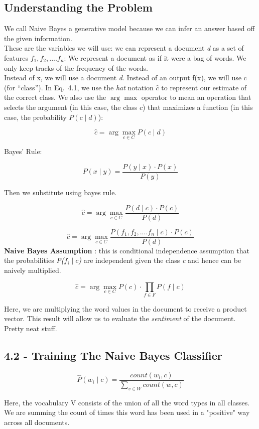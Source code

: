 \documentclass{article}
\begin{document}
\subsection{Understanding the Problem}
We call Naive Bayes a generative model because we can infer an answer based off the given information.
\\These are the variables we will use: we can represent a document \textit{d} as a set of features $f_1, f_2,.... f_n$:
We represent a document as if it were a bag of words. We only keep tracks of the frequency of the words.
\\Instead of x, we will use a document \textit{d}. Instead of an output f(x), we will use c (for “class”).
In Eq.~4.1, we use the \emph{hat} notation $\hat{c}$ to represent our estimate of the correct class.
We also use the $\arg\max$ operator to mean an operation that selects the argument (in this case, the class $c$)
that maximizes a function (in this case, the probability $P(c \mid d)$):

\[
    \hat{c} = \arg\max_{c \in C} P(c \mid d)
\]

Bayes' Rule:

\[
    P(x \mid y) = \frac{P(y \mid x) \cdot P(x)}{P(y)}
\]

Then we substitute using bayes rule.

\[
    \hat{c} = \arg\max_{c \in C} \frac{P(d \mid c) \cdot P(c)}{P(d)}
\]



\[
    \hat{c} = \arg\max_{c \in C} \frac{P(f_1, f_2,....f_n\mid c) \cdot P(c)}{P(d)}
\]
\textbf{Naive Bayes Assumption} : this is conditional independence assumption that the probabilities \textit{P($f_i \mid c$)}
are independent given the class \textit{c} and hence can be naively multiplied.

\[
    \hat{c} = \arg\max_{c \in C} P(c) \cdot \prod_{f \in F} P(f \mid c)
\]

Here, we are multiplying the word values in the document to receive a product vector. This result will allow us to evaluate
the \textit{sentiment} of the document. Pretty neat stuff.

\subsection{4.2 - Training The Naive Bayes Classifier}
\[
    \hat{P}(w_i \mid c) = \frac{count(w_i, c)}{\sum_{v \in W}{count(w,c)}}
\]

Here, the vocabulary V consists of the union of all the word types in all classes. We are summing the count of
times this word has been used in a "positive" way across all documents.
\end{document}
